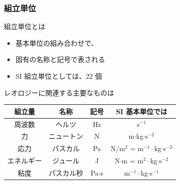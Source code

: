 \documentclass[unicode,12pt,aspectratio=169]{beamer}
\begin{document}
\begin{frame}
	\frametitle{組立単位}
    \begin{block}{組立単位とは}
        \begin{itemize}
			\item 基本単位の組み合わせで、
			\item 固有の名称と記号で表される
			\item SI 組立単位としては、22 個
		\end{itemize}
    \end{block}

    \begin{block}{レオロジーに関連する主要なものは}
        \small
        \centering
		\begin{tabular}{|c|c|c|c|} \hline
			組立量 		& 名称					& 記号		& SI 基本単位では 	\\ \hline \hline
			周波数		& ヘルツ		& Hz		&  s$^{-1}$ 					\\ \hline
			力			& ニュートン	& N 		& m$\cdot$kg$\cdot$s$^{-2}$ 	\\ \hline
			応力		& パスカル		& Pa 		& N/m$^2$ = m$^{-1}\cdot$kg$\cdot$s$^{-2}$ \\ \hline
			エネルギー	& ジュール		& J 		& N$\cdot$m = m$^{2}\cdot$kg$\cdot$s$^{-2}$ \\ \hline
			粘度		& パスカル秒			& Pa$\cdot$s & m$^{-1}\cdot$kg$\cdot$s$^{-1}$ \\ \hline
		\end{tabular}
    \end{block}
\end{frame}
\end{document}
